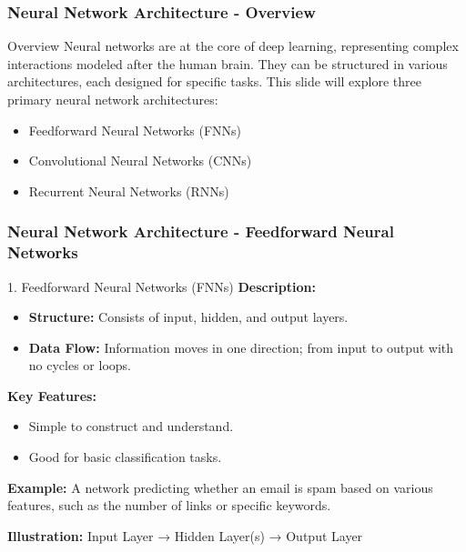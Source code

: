 \documentclass[aspectratio=169]{beamer}
\begin{document}
\begin{frame}[fragile]
  \frametitle{Neural Network Architecture - Overview}
  \begin{block}{Overview}
    Neural networks are at the core of deep learning, representing complex interactions modeled after the human brain. 
    They can be structured in various architectures, each designed for specific tasks. 
    This slide will explore three primary neural network architectures:
    \begin{itemize}
      \item Feedforward Neural Networks (FNNs)
      \item Convolutional Neural Networks (CNNs)
      \item Recurrent Neural Networks (RNNs)
    \end{itemize}
  \end{block}
\end{frame}

\begin{frame}[fragile]
  \frametitle{Neural Network Architecture - Feedforward Neural Networks}
  \begin{block}{1. Feedforward Neural Networks (FNNs)}
    \textbf{Description:}
    \begin{itemize}
      \item \textbf{Structure:} Consists of input, hidden, and output layers.
      \item \textbf{Data Flow:} Information moves in one direction; from input to output with no cycles or loops.
    \end{itemize}
    
    \textbf{Key Features:}
    \begin{itemize}
      \item Simple to construct and understand.
      \item Good for basic classification tasks.
    \end{itemize}

    \textbf{Example:} 
    A network predicting whether an email is spam based on various features, such as the number of links or specific keywords.
    
    \textbf{Illustration:} Input Layer → Hidden Layer(s) → Output Layer
  \end{block}
\end{frame}
\end{document}
